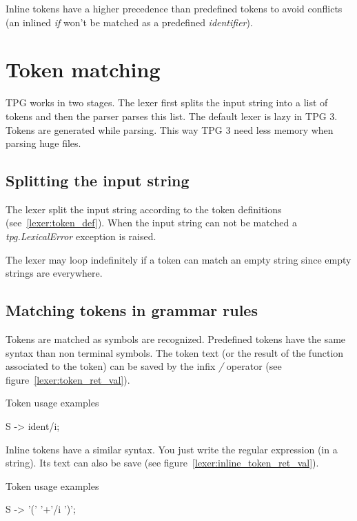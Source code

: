 Inline tokens have a higher precedence than predefined tokens to avoid conflicts (an inlined \emph{if} won't be matched as a predefined \emph{identifier}).

\section{Token matching}                                    \label{lexer:token_matching}

TPG works in two stages.
The lexer first splits the input string into a list of tokens and then the parser parses this list.
The default lexer is lazy in TPG 3. Tokens are generated while parsing.
This way TPG 3 need less memory when parsing huge files.

\subsection{Splitting the input string}

The lexer split the input string according to the token definitions (see~\ref{lexer:token_def}). When the input string can not be matched a \emph{tpg.LexicalError} exception is raised.

The lexer may loop indefinitely if a token can match an empty string since empty strings are everywhere.

\subsection{Matching tokens in grammar rules}

Tokens are matched as symbols are recognized.
Predefined tokens have the same syntax than non terminal symbols.
The token text (or the result of the function associated to the token) can be saved by the infix \emph{/} operator (see figure~\ref{lexer:token_ret_val}).

\begin{code}
\caption{Token usage examples}                              \label{lexer:token_ret_val}
\begin{verbatimtab}[4]
    S -> ident/i;
\end{verbatimtab}
\end{code}

Inline tokens have a similar syntax. You just write the regular expression (in a string). Its text can also be save (see figure~\ref{lexer:inline_token_ret_val}).

\begin{code}
\caption{Token usage examples}                              \label{lexer:inline_token_ret_val}
\begin{verbatimtab}[4]
    S -> '(' '\w+'/i ')';
\end{verbatimtab}
\end{code}

